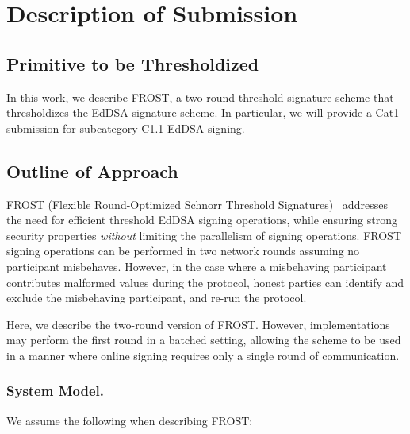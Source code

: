 
\section{Description of Submission}

\subsection{Primitive to be Thresholdized}

In this work,
we describe FROST,
a two-round threshold signature scheme that thresholdizes the EdDSA signature scheme.
In particular,
we will provide a Cat1 submission for subcategory C1.1 EdDSA signing. 

\subsection{Outline of Approach}

FROST (Flexible Round-Optimized Schnorr Threshold Signatures)~\cite{KomloG20,BellareCKMTZ22}  addresses the need for efficient threshold EdDSA signing operations,
while ensuring strong security properties \emph{without} limiting the parallelism of signing operations.
FROST signing operations can be performed in two network rounds assuming no participant misbehaves.
However, in the case where a misbehaving participant contributes malformed values during the protocol,
honest parties can identify and exclude the misbehaving participant, and re-run the protocol. 

Here, we describe the two-round version of FROST.
However, implementations may perform the first round in a batched setting,
allowing the scheme to be used in a manner where online signing requires only a single round of communication.  

\subsubsection{System Model.}
We assume the following when describing FROST:

